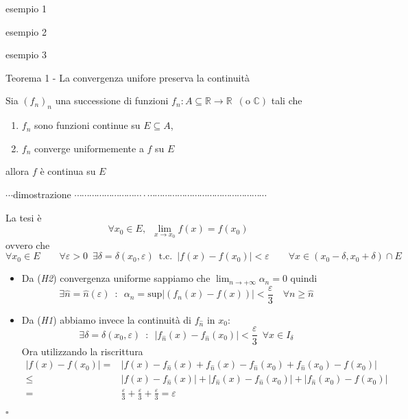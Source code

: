 \documentclass[x11names]{article}
\newcommand*{\QEDB}{\null\nobreak\hfill\ensuremath{\square}}%
\newcommand{\esempio}[2]{
	\begin{es}{esempio #1}
		#2
	\end{es}
}
\newcommand{\teorema}[2]{
	\begin{center}
		\fboxsep11pt
		\colorbox{myred}{\begin{minipage}{5.75in}
				\begin{redes}{#1}
					#2
				\end{redes}
		\end{minipage}}
	\end{center}
}
\newcommand{\dimostrazione}[2]{
	\begin{dym}{\(\cdots\)dimostrazione#1 \(\cdots \cdots \cdots \cdots \cdots \cdots \cdots \cdots \cdots\cdot\cdots\cdots\cdots\cdots\cdots\cdots\cdots\cdots\cdots\cdots\cdots\cdots\cdots\cdots\cdots\cdots\)}
		#2
		\QEDB
	\end{dym}
}
\begin{document}
\esempio{1}{}
\esempio{2}{}
\esempio{3}{}



\teorema{Teorema 1 - La convergenza unifore preserva la continuità}{
Sia \((f_{n})_{n}\) una successione di funzioni \(f_{n}:A\subseteq \mathbb{R}\to \mathbb{R} \;\ (\text{o } \mathbb{C})\) tali che
\begin{enumerate}[start=1,label={(\itshape H\arabic*)}]
	\item \(f_{n}\) sono funzioni continue su \(E\subseteq A\),
	\item \(f_{n}\) converge uniformemente a \(f\) su \(E\)
\end{enumerate}
allora \(f\) è continua su \(E\)
}
\dimostrazione{}{
La tesi è 
\[ 
\forall x_{0} \in E, \;\ \lim_{x\to x_{0}} f(x) = f(x_{0})
\]
ovvero che
\[ 
\forall x_{0} \in E \qquad \forall \varepsilon > 0 \;\ \exists \delta = \delta(x_{0},\varepsilon) \;\ \text{t.c.} \;\ |f(x) - f(x_{0})| < \varepsilon \qquad \forall x \in (x_{0}-\delta,x_{0}+\delta) \cap E 
\]
\begin{itemize}
	\item Da (\textit{H2}) convergenza uniforme sappiamo che \( \lim_{n\to + \infty} \alpha _{n} = 0\) quindi 
	\[\exists \hat{n} = \hat{n}(\varepsilon) \;\ : \;\ \alpha_{n} = \text{sup}|(f_{n}(x) - f(x))| < \frac{\varepsilon}{3} \quad \forall n\geq\hat{n}
	\]
	\item Da (\textit{H1}) abbiamo invece la continuità di \(f_{\hat{n}}\) in \(x_{0}\):
	\[ 
	\exists \delta = \delta(x_{0},\varepsilon) \;\ : \;\ | f_{\hat{n}}(x) - f_{\hat{n}}(x_{0}) | < \frac{\varepsilon}{3} \;\ \forall x \in I_{\delta}
 	\]
 	Ora utilizzando la riscrittura
 	\begin{align*}
 		| f(x) - f(x_{0}) |  =& | f(x) - f_{\hat{n}}(x) + f_{\hat{n}}(x)  - f_{\hat{n}}(x_{0}) + f_{\hat{n}}(x_{0}) - f(x_{0})| \\
 		\leq & |f(x) - f_{\hat{n}}(x)| + |f_{\hat{n}}(x) -f_{\hat{n}}(x_{0})| + |f_{\hat{n}}(x_{0}) - f(x_{0})| \\
 		= & \frac{\varepsilon}{3} + \frac{\varepsilon}{3} + \frac{\varepsilon}{3}  = \varepsilon
 	\end{align*}
\end{itemize} }
\end{document}
